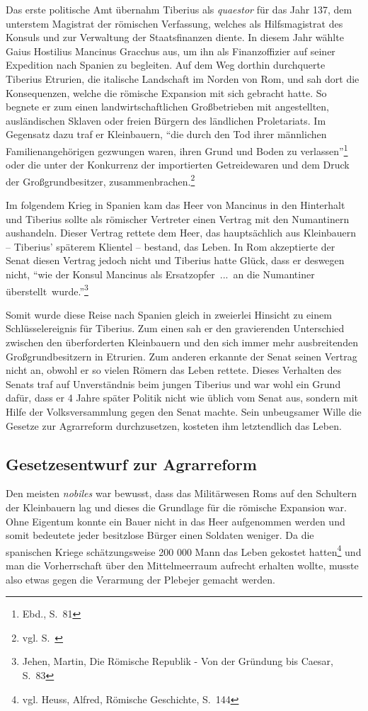 \documentclass[
    12pt,
    smallheadings,
    ]{scrreprt}
\begin{document}
Das erste politische Amt übernahm Tiberius als \textit{quaestor} für das Jahr 137, dem unterstem Magistrat der römischen Verfassung, welches als Hilfsmagistrat des Konsuls und zur Verwaltung der Staatsfinanzen diente.
In diesem Jahr wählte Gaius Hostilius Mancinus Gracchus aus, um ihn als Finanzoffizier auf seiner Expedition nach Spanien zu begleiten.
Auf dem Weg dorthin durchquerte Tiberius Etrurien, die italische Landschaft im Norden von Rom, und sah dort die Konsequenzen, welche die römische Expansion mit sich gebracht hatte.
So begnete er zum einen landwirtschaftlichen Großbetrieben mit angestellten, ausländischen Sklaven oder freien Bürgern des ländlichen Proletariats.
Im Gegensatz dazu traf er Kleinbauern, "`die durch den Tod ihrer männlichen Familienangehörigen gezwungen waren, ihren Grund und Boden zu verlassen"'\footnote{Ebd., S.~81}
oder die unter der Konkurrenz der importierten Getreidewaren und dem Druck der Großgrundbesitzer, zusammenbrachen.\footnote{vgl. S.~\pageref{Latifundien}}

\label{mancinus}
Im folgendem Krieg in Spanien kam das Heer von Mancinus in den Hinterhalt und Tiberius sollte als römischer Vertreter einen Vertrag mit den Numantinern aushandeln.
Dieser Vertrag rettete dem Heer, das hauptsächlich aus Kleinbauern -- Tiberius' späterem Klientel -- bestand, das Leben.
In Rom akzeptierte der Senat diesen Vertrag jedoch nicht und Tiberius hatte Glück, dass er deswegen nicht, "`wie der Konsul Mancinus als Ersatzopfer~\lbrack ...\rbrack~an die Numantiner überstellt~\lbrack wurde\rbrack."'\footnote{Jehen, Martin, Die Römische Republik - Von der Gründung bis Caesar, S.~83}

Somit wurde diese Reise nach Spanien gleich in zweierlei Hinsicht zu einem Schlüs\-sel\-er\-eig\-nis für Tiberius.
Zum einen sah er den gravierenden Unterschied zwischen den überforderten Kleinbauern und den sich immer mehr ausbreitenden Großgrundbesitzern in Etrurien.
Zum anderen erkannte der Senat seinen Vertrag nicht an, obwohl er so vielen Römern das Leben rettete.
Dieses Verhalten des Senats traf auf Unverständnis beim jungen Tiberius und war wohl ein Grund dafür, dass er 4 Jahre später Politik nicht wie üblich vom Senat aus, sondern mit Hilfe der Volksversammlung gegen den Senat machte.
Sein unbeugsamer Wille die Gesetze zur Agrarreform durchzusetzen, kosteten ihm letztendlich das Leben.



        \subsection{Gesetzesentwurf zur Agrarreform}
Den meisten \textit{nobiles} war bewusst, dass das Militärwesen Roms auf den Schultern der Kleinbauern lag und dieses die Grundlage für die römische Expansion war.
Ohne Eigentum konnte ein Bauer nicht in das Heer aufgenommen werden und somit bedeutete jeder besitzlose Bürger einen Soldaten weniger.
Da die spanischen Kriege schätzungsweise 200 000 Mann das Leben gekostet hatten\footnote{vgl. Heuss, Alfred, Römische Geschichte, S.~144}
und man die Vorherrschaft über den Mittelmeerraum aufrecht erhalten wollte, musste also etwas gegen die Verarmung der Plebejer gemacht werden.
\end{document}
